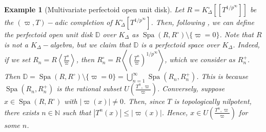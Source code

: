 \documentclass[12pts,a4paper]{amsart}
\newtheorem{example}[proposition]{Example}
\DeclareMathOperator{\spa}{Spa}
\begin{document}
  \begin{example}[Multivariate perfectoid open unit disk]
     Let $R=K^\circ_\Delta[[T^{1/p^\infty}]]$ be the $(\varpi,T)-$adic completion of $K^\circ_\Delta[T^{1/p^\infty}]$. Then, following \cite{Weins}, we can define the \emph{perfectoid open unit disk} $\mathbb{D}$ over $K_\Delta$ as $\spa (R,R^\circ)\setminus \{\varpi=0\}$. Note that $R$ is not a $K_\Delta-$algebra, but we claim that $\mathbb{D}$ is a perfectoid space over $K_\Delta$. Indeed, if we set $R_n=R\left<\frac{T^n}{\varpi}\right>$, then $R^\circ_n=R\left<\left(\frac{T^n}{\varpi}\right)^{1/p^\infty}\right>$, which we consider as $R^+_n$. Then $\mathbb{D}=\spa(R,R^\circ)\setminus\{\varpi=0\}=\bigcup\limits_{n=1}^\infty \spa(R_n,R^+_n)$. This is because $\spa(R_n,R^+_n)$ is the rational subset $U\left(\frac{T^n,\varpi}{\varpi}\right)$. Conversely, suppose $x\in \spa(R,R^\circ)$ with $|\varpi(x)|\neq 0$. Then, since $T$ is topologically nilpotent, there exists $n\in\mathbb{N}$ such that $|T^n(x)|\leq |\varpi(x)|$. Hence, $x\in U\left(\frac{T^n,\varpi}{\varpi}\right)$ for some $n$.
  \end{example}






\end{document}
